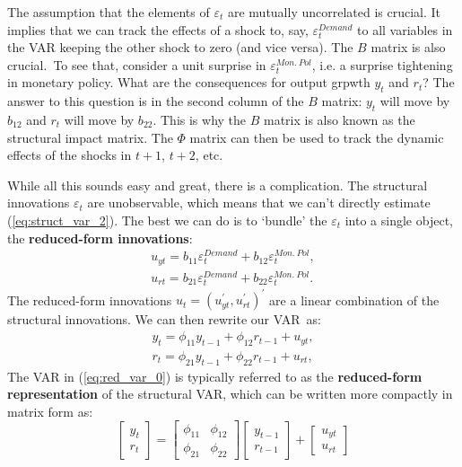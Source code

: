 \documentclass[10pt]{article}
\begin{document}
The assumption that the elements of $\varepsilon _{t}$ are mutually
uncorrelated is crucial. It implies that we can track the effects of a shock
to, say, $\varepsilon _{t}^{Demand}$ to all variables in the VAR keeping the
other shock to zero (and vice versa). The $B$ matrix is also crucial.\ To
see that, consider a unit surprise in $\varepsilon _{t}^{Mon.\ Pol}$, i.e. a
surprise tightening in monetary policy. What are the consequences for output
grpwth $y_{t}$ and $r_{t}$? The answer to this question is in the second
column of the $B$ matrix: $y_{t}$ will move by $b_{12}$ and $r_{t}$ will
move by $b_{22}$. This is why the $B$ matrix is also known as the structural
impact matrix. The $\Phi $ matrix can then be used to track the dynamic
effects of the shocks in $t+1$, $t+2$, etc.

While all this sounds easy and great, there is a complication. The
structural innovations $\varepsilon _{t}$ are unobservable, which means that
we can't directly estimate (\ref{eq:struct_var_2}). The best we can do is to
`bundle' the $\varepsilon _{t}$ into a single object, the \textbf{%
reduced-form innovations}:%
\begin{equation}
\begin{array}{c}
u_{yt}=b_{11}\varepsilon _{t}^{Demand}+b_{12}\varepsilon _{t}^{Mon.\ Pol},
\\
u_{rt}=b_{21}\varepsilon _{t}^{Demand}+b_{22}\varepsilon _{t}^{Mon.\ Pol}.%
\end{array}
\label{eq:red_resid_1}
\end{equation}%
The reduced-form innovations $u_{t}=\left( u_{yt}^{\prime },u_{rt}^{\prime
}\right) ^{\prime }$ are a linear combination of the structural innovations.
We can then rewrite our VAR\ as:%
\begin{equation}
\begin{array}{c}
y_{t}=\phi _{11}y_{t-1}+\phi _{12}r_{t-1}+u_{yt}, \\
r_{t}=\phi _{21}y_{t-1}+\phi _{22}r_{t-1}+u_{rt},%
\end{array}
\label{eq:red_var_0}
\end{equation}%
The VAR in (\ref{eq:red_var_0}) is typically referred to as the \textbf{%
reduced-form representation} of the structural VAR, which can be written
more compactly in matrix form as:%
\begin{equation}
\left[
\begin{array}{c}
y_{t} \\
r_{t}%
\end{array}%
\right] =%
\begin{bmatrix}
\phi _{11} & \phi _{12} \\
\phi _{21} & \phi _{22}%
\end{bmatrix}%
\left[
\begin{array}{c}
y_{t-1} \\
r_{t-1}%
\end{array}%
\right] +\left[
\begin{array}{c}
u_{yt} \\
u_{rt}%
\end{array}%
\right]   \label{eq:red_var_1}
\end{equation}%
\end{document}
